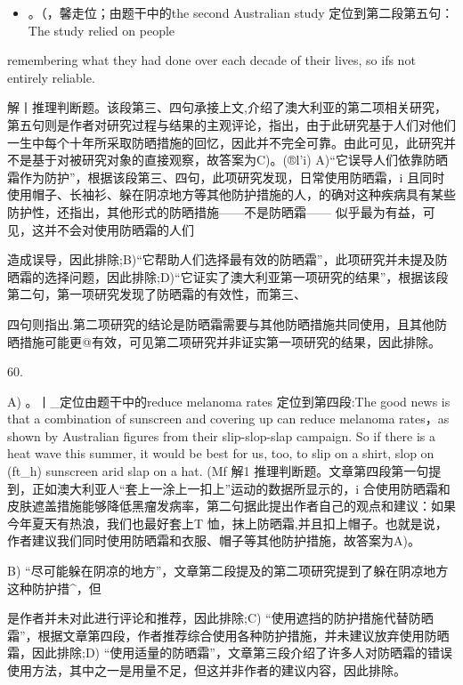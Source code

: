 \documentclass[UTF8,11pt]{ctexart}
\begin{document}
\begin{itemize}[leftmargin=2em,itemsep=.2em,topsep=.4em]\item[C.] 。（，馨走位；由题干中的the second Australian study 定位到第二段第五句：The study relied on people
\end{itemize}

remembering what they had done over each decade of their lives, so ifs not entirely reliable.


解丨推理判断题。该段第三、四句承接上文,介绍了澳大利亚的第二项相关研究，第五句则是作者对研究过程与结果的主观评论，指出，由于此研究基于人们对他们一生中每个十年所采取防晒措施的回忆，因此并不完全可靠。由此可见，此研究并不是基于对被研究对象的直接观察，故答案为C)。(®l'i) A)“它误导人们依靠防晒霜作为防护”，根据该段第三、四句，此项研究发现，日常使用防晒霜，i 且同时使用帽子、长袖衫、躲在阴凉地方等其他防护措施的人，的确对这种疾病具有某些防护性，还指出，其他形式的防晒措施——不是防晒霜—— 似乎最为有益，可见，这并不会对使用防晒霜的人们


造成误导，因此排除;B)“它帮助人们选择最有效的防晒霜”，此项研究并未提及防晒霜的选择问题，因此排除;D)“它证实了澳大利亚第一项研究的结果”，根据该段第二句，第一项研究发现了防晒霜的有效性，而第三、


四句则指出.第二项研究的结论是防晒霜需要与其他防晒措施共同使用，且其他防晒措施可能更@有效，可见第二项研究并非证实第一项研究的结果，因此排除。


60.


A) 。丨\_定位由题干中的reduce melanoma rates 定位到第四段:The good news is that a combination of sunscreen and covering up can reduce melanoma rates，as shown by Australian figures from their slip-slop-slap campaign. So if there is a heat wave this summer, it would be best for us, too, to slip on a shirt, slop on (ft\_h) sunscreen arid slap on a hat. (Mf 解1 推理判断题。文章第四段第一句提到，正如澳大利亚人“套上一涂上一扣上”运动的数据所显示的，i 合使用防晒霜和皮肤遮盖措施能够降低黑瘤发病率，第二句据此提出作者自己的观点和建议：如果今年夏天有热浪，我们也最好套上T 恤，抹上防晒霜,并且扣上帽子。也就是说，作者建议我们同时使用防晒霜和衣服、帽子等其他防护措施，故答案为A)。


B) “尽可能躲在阴凉的地方”，文章第二段提及的第二项研究提到了躲在阴凉地方这种防护措\textasciicircum{}，但


是作者并未对此进行评论和推荐，因此排除;C) “使用遮挡的防护措施代替防晒霜”，根据文章第四段，作者推荐综合使用各种防护措施，并未建议放弃使用防晒霜，因此排除;D) “使用适量的防晒霜”，文章第三段介绍了许多人对防晒霜的错误使用方法，其中之一是用量不足，但这并非作者的建议内容，因此排除。
\end{document}
